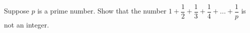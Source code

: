 Suppose  $p$ is a prime number. Show that the number $1+\dfrac{1}{2}+\dfrac{1}{3}+\dfrac{1}{4}+...+\dfrac{1}{p}$ is not an integer.
